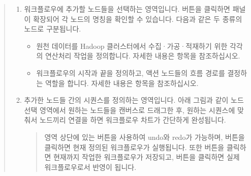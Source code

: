 \documentclass[letterpaper,10pt,english]{sphinxmanual}
\begin{document}
\begin{quote}

\begin{figure}[H]
\centering

\noindent{}
\end{figure}
\begin{enumerate}
\def\theenumi{\arabic{enumi}}
\def\labelenumi{\theenumi .}
\makeatletter\def\p@enumii{\p@enumi \theenumi .}\makeatother
\item {} 
 워크플로우에 추가할 노드들을 선택하는 영역입니다.  버튼을 클릭하면 패널이 확장되어 각 노드의 명칭을 확인할 수 있습니다. 다음과 같은 두 종류의 노드로 구분됩니다.
\begin{itemize}
\item {} 
 원천 데이터를 Hadoop 클러스터에서 수집·가공·적재하기 위한 각각의 연산처리 작업을 정의합니다. 자세한 내용은 {\hyperref[\detokenize{integrator/part03/tasks:action-nodes}]{}} 항목을 참조하십시오.

\item {} 
 워크플로우의 시작과 끝을 정의하고, 액션 노드들의 흐름 경로를 결정하는 역할을 합니다. 자세한 내용은 {\hyperref[\detokenize{integrator/part03/control_flow:control-flow-nodes}]{}} 항목을 참조하십시오.

\end{itemize}

\item {} 
 추가한 노드들 간의 시퀀스를 정의하는 영역입니다. 아래 그림과 같이 노드 선택 영역에서 원하는 노드들을 캔버스로 드래그한 후, 원하는 시퀀스에 맞춰서 노드끼리 연결을 하면 워크플로우 차트가 간단하게 완성됩니다.
\begin{quote}

\begin{figure}[H]
\centering

\noindent{}
\end{figure}

영역 상단에 있는  버튼을 사용하여 undo와 redo가 가능하며,  버튼을 클릭하면 현재 정의된 워크플로우가 실행됩니다. 또한  버튼을 클릭하면 현재까지 작업한 워크플로우가 저장되고,  버튼을 클릭하면 실제 워크플로우로서 반영이 됩니다.
\end{quote}


\end{enumerate}
\end{quote}
\end{document}
